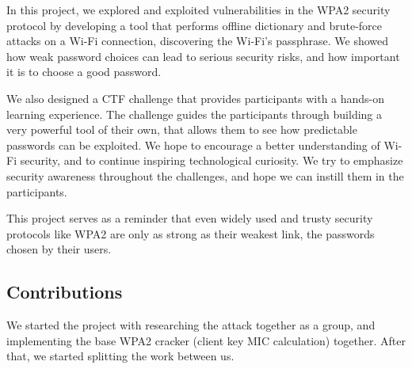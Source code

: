 \documentclass[sigconf]{acmart}
\begin{document}
In this project, we explored and exploited vulnerabilities in the WPA2 security protocol by developing a tool that performs offline dictionary and brute-force attacks on a Wi-Fi connection, discovering the Wi-Fi's passphrase. We showed how weak password choices can lead to serious security risks, and how important it is to choose a good password.

We also designed a CTF challenge that provides participants with a hands-on learning experience. The challenge guides the participants through building a very powerful tool of their own, that allows them to see how predictable passwords can be exploited. We hope to encourage a better understanding of Wi-Fi security, and to continue inspiring technological curiosity. We try to emphasize security awareness throughout the challenges, and hope we can instill them in the participants.

This project serves as a reminder that even widely used and trusty security protocols like WPA2 are only as strong as their weakest link, the passwords chosen by their users.

\subsection{Contributions}

We started the project with researching the attack together as a group, and implementing the base WPA2 cracker (client key MIC calculation) together. After that, we started splitting the work between us.
\end{document}
